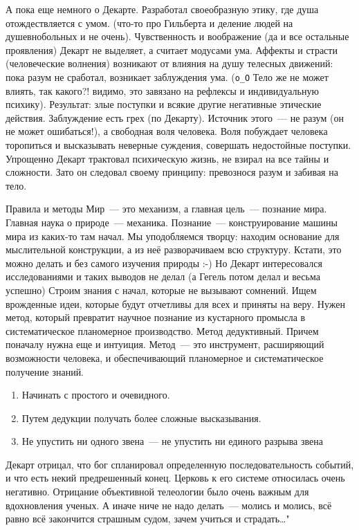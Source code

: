 А пока еще немного о Декарте.
Разработал своеобразную этику, где душа отождествляется с умом. (что-то про Гильберта и деление людей на душевнобольных и не очень). Чувственность и воображение (да и все остальные проявления) Декарт не выделяет, а считает модусами ума. Аффекты и страсти (человеческие волнения) возникают от влияния на душу телесных движений: пока разум не сработал, возникает заблуждения ума. (\texttt{o\_O} Тело же не может влиять, так какого?! видимо, это завязано на рефлексы и индивидуальную психику). Результат: злые поступки и всякие другие негативные этические действия. Заблуждение есть грех (по Декарту). Источник этого~--- не разум (он не может ошибаться!), а свободная воля человека. Воля побуждает человека торопиться и высказывать неверные суждения, совершать недостойные поступки. Упрощенно Декарт трактовал психическую жизнь, не взирал на все тайны и сложности. Зато он следовал своему принципу: превознося разум и забивая на тело.

Правила и методы
Мир~--- это механизм, а главная цель~--- познание мира. Главная наука о природе~--- механика. Познание~--- конструирование машины мира из каких-то там начал. Мы уподобляемся творцу: находим основание для мыслительной конструкции, а из неё разворачиваем всю структуру. Кстати, это можно делать и без самого изучения природы :-) Но Декарт интересовался исследованиями и таких выводов не делал (а Гегель потом делал и весьма успешно) 
Строим знания с начал, которые не вызывают сомнений. Ищем врожденные идеи, которые будут отчетливы для всех и приняты на веру. Нужен метод, который превратит научное познание из кустарного промысла в систематическое планомерное производство. Метод дедуктивный. Причем поначалу нужна еще и интуиция. Метод~--- это инструмент, расширяющий возможности человека, и обеспечивающий планомерное и систематическое получение знаний.
\begin{enumerate}
	\item Начинать с простого и очевидного. 
	\item Путем дедукции получать более сложные высказывания. 
	\item Не упустить ни одного звена~--- не упустить ни единого разрыва звена
\end{enumerate}

Декарт отрицал, что бог спланировал определенную последовательность событий, и что есть некий предрешенный конец. Церковь к его системе относилась очень негативно. Отрицание объективной телеологии было очень важным для вдохновления ученых. А иначе ниче не надо делать~--- молись и молись, всё равно всё закончится страшным судом, зачем учиться и страдать\ldots"

